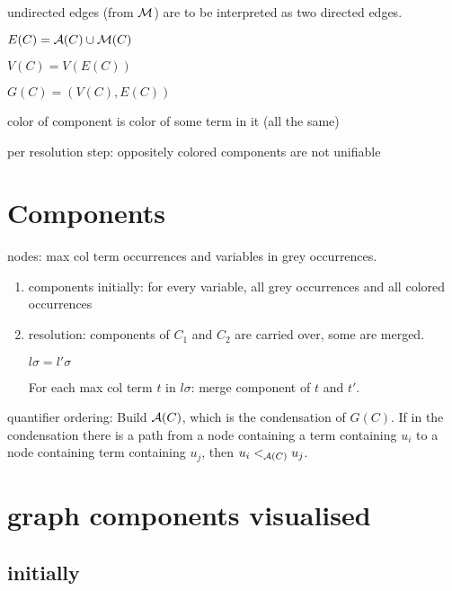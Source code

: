 \documentclass[,%
	paper=a4,%
	DIV10, %
	twoside=false,%
	liststotoc,
	bibtotoc,
	draft=false,%
	numbers=noendperiod
]{scrartcl}
\begin{document}
undirected edges (from $\operatorname{\mathcal{M}}$) are to be interpreted as two directed edges.

$E(C) = \operatorname{\mathcal{A}}(C)\cup\operatorname{\mathcal{M}}(C)$

$V(C) = V(E(C))$

$G(C) = (V(C), E(C))$


color of component is color of some term in it (all the same)

per resolution step: 
oppositely colored components are not unifiable

\section*{Components}

nodes: max col term occurrences and variables in grey occurrences.

\begin{enumerate}
	\item

		components initially:
		for every variable, all grey occurrences and all colored occurrences 

	\item
		resolution: 
		components of $C_1$ and $C_2$ are carried over, some are merged.

		$l\sigma = l'\sigma$

		For each max col term $t$ in $l\sigma$: merge component of $t$ and $t'$.

\end{enumerate}

quantifier ordering: Build $\operatorname{\mathcal{A}}(C)$, which is the condensation of $G(C)$. If in the condensation there is a path from a node containing a term containing $u_i$ to a node containing term containing $u_j$, then $u_i <_{\operatorname{\mathcal{A}}(C)} u_j$.

\section*{graph components visualised}

\subsection*{initially}
\end{document}

